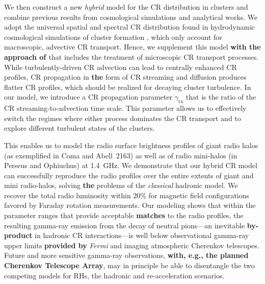 \documentclass[traditabstract]{aa}
\def\C#1{{\bf #1}}
\newcommand{\rmn}{\mathrm}
\begin{document}

We then construct a new \emph{hybrid} model for the CR distribution in clusters
and combine previous results from cosmological simulations and analytical works.
We adopt the universal spatial and spectral CR distribution found in
hydrodynamic cosmological simulations of cluster formation
\citep{2010MNRAS.409..449P}, which only account for macroscopic, advective CR
transport. Hence, we supplement this model \C{with the approach of
\cite{2011A&A...527A..99E}} that includes the treatment of microscopic CR
transport processes. While turbulently-driven CR advection can lead to centrally
enhanced CR profiles, CR propagation in \C{the} form of CR streaming and diffusion
produces flatter CR profiles, which should be realized for decaying cluster
turbulence. In our model, we introduce a CR propagation parameter
$\gamma_{\rmn{tu}}$ that is the ratio of the CR streaming-to-advection time
scale. This parameter allows us to effectively switch the regimes where either
process dominates the CR transport and to explore different turbulent states of
the clusters.

This enables us to model the radio surface brightness profiles of giant radio
halos (as exemplified in Coma and Abell~2163) as well as of radio mini-halos (in
Perseus and Ophiuchus) at 1.4~GHz. We demonstrate that our hybrid CR model can
successfully reproduce the radio profiles over the entire extents of giant and
mini radio-halos, solving \C{the} problems of the \emph{classical} hadronic model. We
recover the total radio luminosity within 20\% for magnetic field configurations
favored by Faraday rotation measurements. Our modeling shows that within the
parameter ranges that provide acceptable \C{matches} to the radio profiles, the
resulting gamma-ray emission from the decay of neutral pions---an inevitable
\C{by-product} in hadronic CR interactions---is well below observational gamma-ray
upper limits \C{provided by} {\em Fermi} and imaging atmospheric Cherenkov telescopes. 
Future and more sensitive gamma-ray observations, \C{with, e.g., the planned Cherenkov Telescope Array},
may in principle be able to disentangle  the two competing models for RHs, the hadronic and re-acceleration scenarios.
\end{document}
